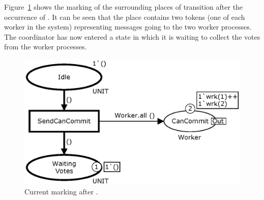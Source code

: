 
Figure~\ref{fig:sendcancommit} shows the marking of the surrounding
places of transition  after the occurrence of
. It can be seen that the place
 contains two tokens (one of each worker in the
system) representing messages going to the two worker processes. The
coordinator has now entered a state in which it is waiting to collect
the votes from the worker processes.

\begin{figure}[b]
\centering
\includegraphics[scale=.45]{figures/SendCanCommit.eps}
\caption{Current marking after .}
\label{fig:sendcancommit}
\end{figure}





